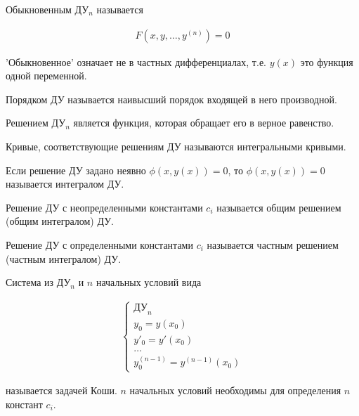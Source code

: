 
\begin{definition}
  Обыкновенным ДУ\(_{n}\) называется

  \begin{align*}
    F(x, y, \dotsc, y^{(n)}) = 0
  \end{align*}
\end{definition}

\begin{remark}
  'Обыкновенное' означает не в частных дифференциалах, т.е. \(y(x)\) это
  функция одной переменной.
\end{remark}

\begin{definition}
  Порядком ДУ называется наивысший порядок входящей в него производной.
\end{definition}

\begin{definition}
  Решением ДУ\(_{n}\) является функция, которая обращает его в верное равенство.
\end{definition}

\begin{definition}
  Кривые, соответствующие решениям ДУ называются интегральными кривыми.
\end{definition}

\begin{definition}
  Если решение ДУ задано неявно \(\phi(x, y(x)) = 0\), то 
  \(\phi(x, y(x)) = 0\) называется интегралом ДУ.
\end{definition}

\begin{definition}
  Решение ДУ с неопределенными константами \(c_{i}\) называется общим решением
  (общим интегралом) ДУ.  
\end{definition}

\begin{definition}
  Решение ДУ с определенными константами \(c_{i}\) называется частным решением
  (частным интегралом) ДУ.
\end{definition} 

\begin{definition}
  Система из ДУ\(_{n}\) и \(n\) начальных условий вида

  \begin{align*}
    \begin{cases}
      \text{ДУ}_n \\
      y_0 = y(x_0) \\
      y'_0 = y'(x_0) \\
      \dots \\
      y^{(n - 1)}_0 = y^{(n - 1)}(x_0)
    \end{cases}
  \end{align*}

  называется задачей Коши. \(n\) начальных условий необходимы для определения
  \(n\) констант \(c_{i}\).
\end{definition}


